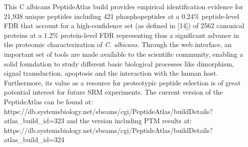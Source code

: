 This C albicans PeptideAtlas build provides empirical identification
 evidence for 21,938 unique peptides including 421
phosphopeptides at a 0.24\% peptide-level FDR that account for a
high-confidence set (as defined in [14]) of 2562 canonical proteins
at a 1.2\% protein-level FDR representing thus a significant
advance in the proteomic characterization of \textit{C. albicans}.
Through the web interface, an important set of tools are
made available to the scientific community, enabling a solid
foundation to study different basic biological processes like
dimorphism, signal transduction, apoptosis and the interaction
with the human host. Furthermore, its value as a resource for
proteotypic peptide selection is of great potential interest for
future SRM experiments.
The current version of the PeptideAtlas can be found
at: 
https://db.systemsbiology.net/sbeams/cgi/PeptideAtlas/buildDetails?atlas\_build\_id=323
and the version including PTM results at:\newline{}
https://db.systemsbiology.net/sbeams/cgi/PeptideAtlas/buildDetails?atlas\_build\_id=324
